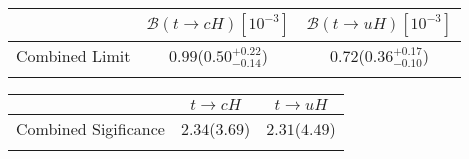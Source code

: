 \centering
\begin{tabular}{ccc} \toprule\toprule
 & $\mathcal{B}(t\to cH)[10^{-3}]$ & $\mathcal{B}(t\to uH)[10^{-3}]$\\\midrule
Combined Limit & $0.99$($0.50^{+0.22}_{-0.14}$) & $0.72$($0.36^{+0.17}_{-0.10}$)\\
\bottomrule\bottomrule\\
\end{tabular}

\centering
\begin{tabular}{ccc} \toprule\toprule
 & $t\to cH$ & $t\to uH$\\\midrule
Combined Sigificance & $2.34$($3.69$) & $2.31$($4.49$)\\
\bottomrule\bottomrule\\
\end{tabular}